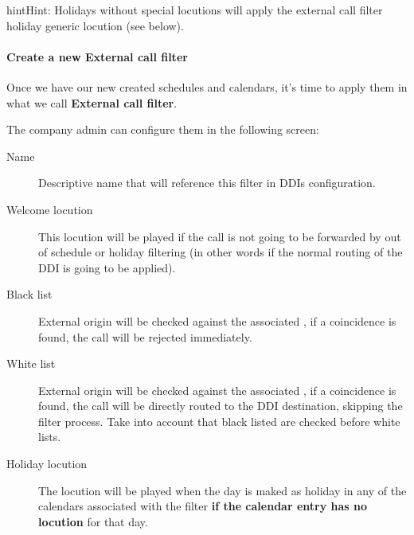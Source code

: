 \documentclass[letterpaper,10pt,english]{sphinxmanual}
\begin{document}
\begin{notice}{hint}{Hint:}
Holidays without special locutions will apply the external call filter
holiday generic locution (see below).
\end{notice}
\paragraph{Create a new External call filter}

Once we have our new created schedules and calendars, it's time to apply them
in what we call \textbf{External call filter}.

The company admin can configure them in the following screen:

\noindent{}
\begin{description}
\item[{Name}] \leavevmode{}\label{pbx_features/external_filters:term-name}
Descriptive name that will reference this filter in DDIs configuration.

\item[{Welcome locution}] \leavevmode{}\label{pbx_features/external_filters:term-welcome-locution}
This locution will be played if the call is not going to be
forwarded by out of schedule or holiday filtering (in other words if
the normal routing of the DDI is going to be applied).

\item[{Black list}] \leavevmode{}\label{pbx_features/external_filters:term-black-list}
External origin will be checked against the associated {\hyperref[pbx_features/match_lists:match\string-lists]{}},
if a coincidence is found, the call will be rejected immediately.

\item[{White list}] \leavevmode{}\label{pbx_features/external_filters:term-white-list}
External origin will be checked against the associated {\hyperref[pbx_features/match_lists:match\string-lists]{}},
if a coincidence is found, the call will be directly routed to the DDI
destination, skipping the filter process. Take into account that black
listed are checked before white lists.

\item[{Holiday locution}] \leavevmode{}\label{pbx_features/external_filters:term-holiday-locution}
The locution will be  played when the day is maked as holiday in any
of the calendars associated with the filter \textbf{if the calendar entry has
no locution} for that day.


\end{description}
\end{document}

